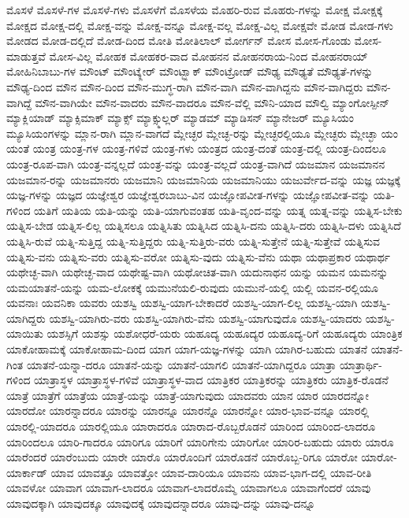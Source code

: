 {ಮೊಸಳೆ
ಮೊಸಳೆ-ಗಳ
ಮೊಸಳೆ-ಗಳು
ಮೊಸಳೆಗೆ
ಮೊಸಳೆಯ
ಮೊಹರಿ-ರುವ
ಮೊಹರು-ಗಳನ್ನು
ಮೋಕ್ಷ
ಮೋಕ್ಷಕ್ಕೆ
ಮೋಕ್ಷದ
ಮೋಕ್ಷ-ದಲ್ಲಿ
ಮೋಕ್ಷ-ವನ್ನು
ಮೋಕ್ಷ-ವನ್ನೂ
ಮೋಕ್ಷ-ವಲ್ಲ
ಮೋಕ್ಷ-ವಿಲ್ಲ
ಮೋಕ್ಷವೇ
ಮೋಡ
ಮೋಡ-ಗಳು
ಮೋಡದ
ಮೋಡ-ದಲ್ಲಿದೆ
ಮೋಡ-ದಿಂದ
ಮೋತಿ
ಮೋತಿಲಾಲ್
ಮೋರ್ಗನ್
ಮೋಸ
ಮೋಸ-ಗೊಂಡು
ಮೋಸ-ಮಾಡುತ್ತವೆ
ಮೋಸ-ವಿಲ್ಲ
ಮೋಹಕ
ಮೋಹಕರ-ವಾದ
ಮೋಹನನ
ಮೋಹನರಾಯ-ನಿಂದ
ಮೋಹನರಾಯ್
ಮೋಹಿನಿಬಾಬು-ಗಳ
ಮೌಂಟ್
ಮೌಂಟ್ಕ್ಲೇರ್
ಮೌಂಟ್ಬ್ಲಾಕ್
ಮೌಂಟ್ರೋಡ್
ಮೌಢ್ಯ
ಮೌಢ್ಯತೆ
ಮೌಢ್ಯತೆ-ಗಳನ್ನು
ಮೌಢ್ಯ-ದಿಂದ
ಮೌನ
ಮೌನ-ದಿಂದ
ಮೌನ-ಮುಗ್ಧ-ರಾಗಿ
ಮೌನ-ವಾಗಿ
ಮೌನ-ವಾಗಿದ್ದನು
ಮೌನ-ವಾಗಿದ್ದರು
ಮೌನ-ವಾಗಿದ್ದೆ
ಮೌನ-ವಾಗಿಯೇ
ಮೌನ-ವಾದರು
ಮೌನ-ವಾದರೂ
ಮೌನ-ವೆಲ್ಲಿ
ಮೌನಿ-ಯಾದ
ಮೌಲ್ವಿ
ಮ್ಯಾಂಗೋಸ್ಪೀನ್
ಮ್ಯಾಕ್ಲಿಯಾಡ್
ಮ್ಯಾಕ್ಸಿಮಾಕ್
ಮ್ಯಾಕ್ಸ್
ಮ್ಯಾಕ್ಸ್ಮುಲ್ಲರ್
ಮ್ಯಾಡಮ್
ಮ್ಯಾಡಿಸನ್
ಮ್ಯಾನೇಜರ್
ಮ್ಯೂಸಿಯಂ
ಮ್ಯೂಸಿಯಂಗಳನ್ನು
ಮ್ಲಾನ-ರಾಗಿ
ಮ್ಲಾನ-ವಾಗದೆ
ಮ್ಲೇಚ್ಛರ
ಮ್ಲೇಚ್ಛ-ರನ್ನು
ಮ್ಲೇಚ್ಛರಲ್ಲಿಯೂ
ಮ್ಲೇಚ್ಛರು
ಮ್ಲೇಚ್ಛಾ
ಯಂ
ಯಂತೆ
ಯಂತ್ರ
ಯಂತ್ರ-ಗಳ
ಯಂತ್ರ-ಗಳಿವೆ
ಯಂತ್ರ-ಗಳು
ಯಂತ್ರದ
ಯಂತ್ರ-ದಂತೆ
ಯಂತ್ರ-ದಲ್ಲಿ
ಯಂತ್ರ-ದಿಂದಲೂ
ಯಂತ್ರ-ರೂಪ-ವಾಗಿ
ಯಂತ್ರ-ವನ್ನಲ್ಲದೆ
ಯಂತ್ರ-ವನ್ನು
ಯಂತ್ರ-ವಲ್ಲದೆ
ಯಂತ್ರ-ವಾಗಿದೆ
ಯಜಮಾನ
ಯಜಮಾನನ
ಯಜಮಾನ-ರನ್ನು
ಯಜಮಾನರು
ಯಜಮಾನಿ
ಯಜಮಾನಿಯ
ಯಜಮಾನಿಯು
ಯಜುರ್ವೇದ-ವನ್ನು
ಯಜ್ಞ
ಯಜ್ಞಕ್ಕೆ
ಯಜ್ಞ-ಗಳನ್ನು
ಯಜ್ಞದ
ಯಜ್ಞೇಶ್ವರ
ಯಜ್ಞೇಶ್ವರಬಾಬು-ವಿನ
ಯಜ್ಞೋಪವೀತ-ಗಳನ್ನು
ಯಜ್ಞೋಪವೀತ-ವನ್ನು
ಯತಿ-ಗಳಿಂದ
ಯತಿಗೆ
ಯತಿಯ
ಯತಿ-ಯನ್ನು
ಯತಿ-ಯಾಗುವಂತಹ
ಯತಿ-ವೃಂದ-ವನ್ನು
ಯತ್ನ
ಯತ್ನ-ವನ್ನು
ಯತ್ನಿಸ-ಬೇಕು
ಯತ್ನಿಸ-ಬೇಡ
ಯತ್ನಿಸ-ಲಿಲ್ಲ
ಯತ್ನಿಸಲೂ
ಯತ್ನಿಸಿತು
ಯತ್ನಿಸಿದ
ಯತ್ನಿಸಿ-ದನು
ಯತ್ನಿಸಿ-ದರು
ಯತ್ನಿಸಿ-ದಳು
ಯತ್ನಿಸಿದೆ
ಯತ್ನಿಸಿ-ರುವೆ
ಯತ್ನಿ-ಸುತ್ತಿದ್ದ
ಯತ್ನಿ-ಸುತ್ತಿದ್ದರು
ಯತ್ನಿ-ಸುತ್ತಿರು-ವರು
ಯತ್ನಿ-ಸುತ್ತೇನೆ
ಯತ್ನಿ-ಸುತ್ತೇವೆ
ಯತ್ನಿಸುವ
ಯತ್ನಿಸು-ವನು
ಯತ್ನಿಸು-ವರು
ಯತ್ನಿಸು-ವರೋ
ಯತ್ನಿಸು-ವುದು
ಯತ್ನಿಸು-ವೆನು
ಯಥಾ
ಯಥಾಪ್ರಕಾರ
ಯಥಾರ್ಥ
ಯಥೇಚ್ಛ-ವಾಗಿ
ಯಥೇಚ್ಛ-ವಾದ
ಯಥೇಷ್ಟ-ವಾಗಿ
ಯಥೋಚಿತ-ವಾಗಿ
ಯದುನಾಥನ
ಯನ್ನು
ಯಮನ
ಯಮನನ್ನು
ಯಮಯಾತನೆ-ಯನ್ನು
ಯಮ-ಲೋಕಕ್ಕೆ
ಯಮುನೆಯಲಿ-ರುವುದು
ಯಮುನೆ-ಯಲ್ಲಿ
ಯಲ್ಲಿ
ಯವನ-ರಲ್ಲಿಯೂ
ಯವನಾಃ
ಯವನಿಕಾ
ಯವರು
ಯಶಸ್ವಿ
ಯಶಸ್ವಿ-ಯಾಗ-ಬೇಕಾದರೆ
ಯಶಸ್ವಿ-ಯಾಗ-ಲಿಲ್ಲ
ಯಶಸ್ವಿ-ಯಾಗಿ
ಯಶಸ್ವಿ-ಯಾಗಿದ್ದರು
ಯಶಸ್ವಿ-ಯಾಗಿರು-ವರು
ಯಶಸ್ವಿ-ಯಾಗಿರು-ವೆನು
ಯಶಸ್ವಿ-ಯಾಗುವುದೊ
ಯಶಸ್ವಿ-ಯಾದರು
ಯಶಸ್ವಿ-ಯಾಯಿತು
ಯಶಸ್ಸಿಗೆ
ಯಶಸ್ಸು
ಯಶೋಧರೆ-ಯರು
ಯಹೂದ್ಯ
ಯಹೂದ್ಯರ
ಯಹೂದ್ಯ-ರಿಗೆ
ಯಹೂದ್ಯರು
ಯಾಂತ್ರಿಕ
ಯಾಕೋಹಾಮಕ್ಕೆ
ಯಾಕೋಹಾಮ-ದಿಂದ
ಯಾಗ
ಯಾಗ-ಯಜ್ಞ-ಗಳನ್ನು
ಯಾಗಿ
ಯಾಗಿರ-ಬಹುದು
ಯಾತನೆ
ಯಾತನೆ-ಗಿಂತ
ಯಾತನೆ-ಯನ್ನಾ-ದರೂ
ಯಾತನೆ-ಯನ್ನು
ಯಾತನೆ-ಯಾಗಲಿ
ಯಾತನೆ-ಯಾಗಿದ್ದರೂ
ಯಾತ್ರಾ
ಯಾತ್ರಾರ್ಥಿ-ಗಳಿಂದ
ಯಾತ್ರಾಸ್ಥಳ
ಯಾತ್ರಾಸ್ಥಳ-ಗಳಿವೆ
ಯಾತ್ರಾಸ್ಥಳ-ವಾದ
ಯಾತ್ರಿಕರ
ಯಾತ್ರಿಕರನ್ನು
ಯಾತ್ರಿಕರು
ಯಾತ್ರಿಕ-ರೊಡನೆ
ಯಾತ್ರೆ
ಯಾತ್ರೆಗೆ
ಯಾತ್ರೆಯ
ಯಾತ್ರೆ-ಯನ್ನು
ಯಾತ್ರೆ-ಯಾಗುವುದು
ಯಾದವರು
ಯಾನ
ಯಾರ
ಯಾರದನ್ನೋ
ಯಾರದೋ
ಯಾರನ್ನಾದರೂ
ಯಾರನ್ನು
ಯಾರನ್ನೂ
ಯಾರನ್ನೊ
ಯಾರನ್ನೋ
ಯಾರ-ಭಾವ-ವನ್ನೂ
ಯಾರಲ್ಲಿ
ಯಾರಲ್ಲಿ-ಯಾದರೂ
ಯಾರಲ್ಲಿಯೂ
ಯಾರಾದರೂ
ಯಾರಾದ-ರೊಬ್ಬರೊಡನೆ
ಯಾರಿಂದ
ಯಾರಿಂದ-ಲಾದರೂ
ಯಾರಿಂದಲೂ
ಯಾರಿ-ಗಾದರೂ
ಯಾರಿಗೂ
ಯಾರಿಗೆ
ಯಾರಿಗೇನು
ಯಾರಿಗೋ
ಯಾರಿರ-ಬಹುದು
ಯಾರು
ಯಾರೂ
ಯಾರೆಂದರೆ
ಯಾರೆಂಬುದು
ಯಾರೇ
ಯಾರೊ
ಯಾರೊಂದಿಗೆ
ಯಾರೊಡನೆ
ಯಾರೊಬ್ಬ-ರಿಗೂ
ಯಾರೋ
ಯಾರೋ-
ಯಾರ್ಕಾಡ್
ಯಾವ
ಯಾವತ್ತೂ
ಯಾವತ್ತೋ
ಯಾವ-ದಾರಿಯೂ
ಯಾವನು
ಯಾವ-ಭಾಗ-ದಲ್ಲಿ
ಯಾವ-ರೀತಿ
ಯಾವಳೋ
ಯಾವಾಗ
ಯಾವಾಗ-ಲಾದರೂ
ಯಾವಾಗ-ಲಾದರೊಮ್ಮೆ
ಯಾವಾಗಲೂ
ಯಾವಾಗೆಂದರೆ
ಯಾವು
ಯಾವುದಕ್ಕಾಗಿ
ಯಾವುದಕ್ಕೂ
ಯಾವುದಕ್ಕೆ
ಯಾವುದನ್ನಾದರೂ
ಯಾವು-ದನ್ನು
ಯಾವು-ದನ್ನೂ
}
